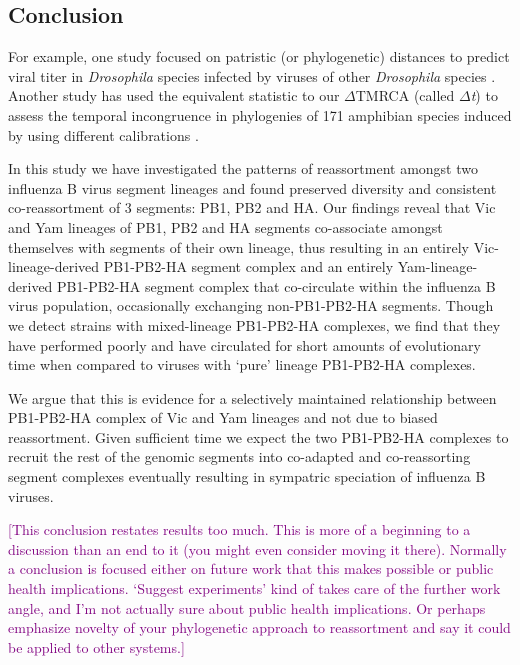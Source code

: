 \documentclass[11pt,oneside,letterpaper]{article}
\def\tbc#1{\textcolor{purple}{[#1]}}
\begin{document}
\subsection*{Conclusion}
For example, one study focused on patristic (or phylogenetic) distances to predict viral titer in \textit{Drosophila} species infected by viruses of other \textit{Drosophila} species \cite{longdon2011}.
Another study has used the equivalent statistic to our $\Delta$TMRCA (called $\Delta$\textit{t}) to assess the temporal incongruence in phylogenies of 171 amphibian species induced by using different calibrations \cite{ruane2011}.

In this study we have investigated the patterns of reassortment amongst two influenza B virus segment lineages and found preserved diversity and consistent co-reassortment of 3 segments: PB1, PB2 and HA.
Our findings reveal that Vic and Yam lineages of PB1, PB2 and HA segments co-associate amongst themselves with segments of their own lineage, thus resulting in an entirely Vic-lineage-derived PB1-PB2-HA segment complex and an entirely Yam-lineage-derived PB1-PB2-HA segment complex that co-circulate within the influenza B virus population, occasionally exchanging non-PB1-PB2-HA segments.
Though we detect strains with mixed-lineage PB1-PB2-HA complexes, we find that they have performed poorly and have circulated for short amounts of evolutionary time when compared to viruses with `pure' lineage PB1-PB2-HA complexes.

We argue that this is evidence for a selectively maintained relationship between PB1-PB2-HA complex of Vic and Yam lineages and not due to biased reassortment.
Given sufficient time we expect the two PB1-PB2-HA complexes to recruit the rest of the genomic segments into co-adapted and co-reassorting segment complexes eventually resulting in sympatric speciation of influenza B viruses.

\tbc{This conclusion restates results too much.  This is more of a beginning to a discussion than an end to it (you might even consider moving it there).  Normally a conclusion is focused either on future work that this makes possible or public health implications.  `Suggest experiments' kind of takes care of  the further work angle, and I'm not actually sure about public health implications. Or perhaps emphasize novelty of your phylogenetic approach to reassortment and say it could be applied to other systems.}
\end{document}
